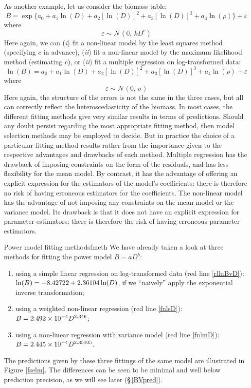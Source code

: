As another example, let us consider the biomass table:
\[
B=\exp\{a_0+a_1\ln(D)+a_2[\ln(D)]^2+a_3[\ln(D)]^3+a_4\ln(\rho)\}+\varepsilon
\]
where
\[
\varepsilon\sim\mathcal{N}(0,\,kD^c)
\]
Here again, we can (\emph{i}) fit a non-linear model by the least squares method (specifying $c$ in advance), (\emph{ii}) fit a non-linear model by the maximum likelihood method (estimating $c$), or (\emph{ii}) fit a multiple regression on log-transformed data:
\[
\ln(B)=a_0+a_1\ln(D)+a_2[\ln(D)]^2+a_3[\ln(D)]^3+a_4\ln(\rho)+\varepsilon
\]
where
\[
\varepsilon\sim\mathcal{N}(0,\,\sigma)
\]
Here again, the structure of the errors is not the same in the three cases, but all can correctly reflect the heteroscedasticity of the biomass.
In most cases, the different fitting methods give very similar results in terms of predictions. Should any doubt persist regarding the most appropriate fitting method, then model selection methods may be employed to decide. But in practice the choice of a particular fitting method results rather from the importance given to the respective advantages and drawbacks of each method. Multiple regression has the drawback of imposing constraints on the form of the residuals, and has less flexibility for the mean model. By contrast, it has the advantage of offering an explicit expression for the estimators of the model's coefficients: there is therefore no risk of having erroneous estimators for the coefficients. The non-linear model has the advantage of not imposing any constraints on the mean model or the variance model. Its drawback is that it does not have an explicit expression for parameter estimators: there is therefore the risk of having erroneous parameter estimators.

\begin{filrouge}{Power model fitting methods}{fmeth}%
We have already taken a look at three methods for fitting the power model $B=aD^b$:
\begin{enumerate}
\item using a simple linear regression on log-transformed data (red line \ref{rllnBvD}):
$\ln(B)=-\decimal{8}{42722}\bidouille{\newline}%
+\decimal{2}{36104}\ln(D)$, if we ``naively'' apply the exponential inverse transformation;
\item using a weighted non-linear regression (red line \ref{fnlsD}):
$B=\mbox{2.492}\times10^{-4}D^{2.346}$;
\item using a non-linear regression with variance model (red line \ref{fnlmD}): $B=\decimal{2}{445}\bidouille{\newline}%
\times10^{-4}D^{2.35105}$.
\end{enumerate}
The predictions given by these three fittings of the same model are illustrated in  Figure \ref{fselm}. The differences can be seen to be minimal and well below prediction precision, as we will see later (\S\,\ref{BVpred}).
\end{filrouge}

